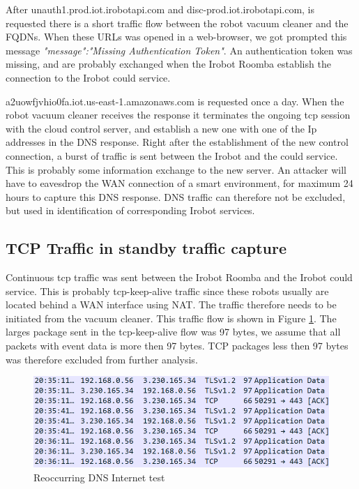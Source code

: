 After unauth1.prod.iot.irobotapi.com and disc-prod.iot.irobotapi.com, is requested there is a short traffic flow between the robot vacuum cleaner and the FQDNs. When these URLs was opened in a web-browser, we got prompted this message \textit{"message":"Missing Authentication Token"}. An authentication token was missing, and are probably exchanged when the Irobot Roomba establish the connection to the Irobot could service. 

a2uowfjvhio0fa.iot.us-east-1.amazonaws.com is requested once a day. When the robot vacuum cleaner receives the response it terminates the ongoing tcp session with the cloud control server, and establish a new one with one of the Ip addresses in the DNS response. Right after the establishment of the new control connection, a burst of traffic is sent between the Irobot and the could service. This is probably some information exchange to the new server. An attacker will have to eavesdrop the WAN connection of a smart environment, for maximum 24 hours to capture this DNS response. DNS traffic can therefore not be excluded, but used in identification of corresponding Irobot services. 

\subsection{TCP Traffic in standby traffic capture}
Continuous tcp traffic was sent between the Irobot Roomba and the Irobot could service. This is probably tcp-keep-alive traffic since these robots usually are located behind a WAN interface using NAT. The traffic therefore needs to be initiated from the vacuum cleaner. This traffic flow is shown in Figure \ref{fig:tcp_keep-alive}. The larges package sent in the tcp-keep-alive flow was 97 bytes, we assume that all packets with event data is more then 97 bytes. TCP packages less then 97 bytes was therefore excluded from further analysis. 

\begin{figure}[H]
    \centering
    \includegraphics[width=\textwidth]{figures/tcp_keep-alive.png}
    \caption{Reoccurring DNS Internet test}
    \label{fig:tcp_keep-alive}
\end{figure}

